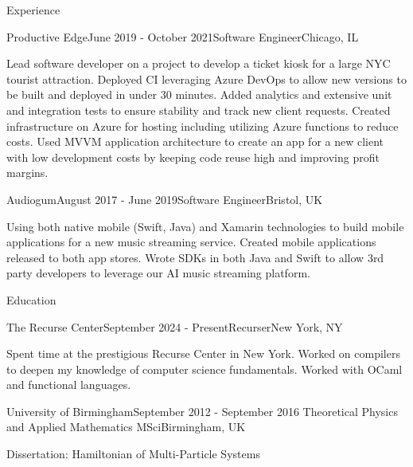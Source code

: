 \documentclass[
	11pt, %
]{resume} %
\begin{document}
\begin{rSection}{Experience}
	\begin{rSubsection}{Productive Edge}{June 2019 - October 2021}{Software Engineer}{Chicago, IL}
		\item Lead software developer on a project to develop a ticket kiosk for a large NYC tourist attraction. Deployed CI leveraging Azure DevOps to allow new versions to be built and deployed in under 30 minutes. Added analytics and extensive unit and integration tests to ensure stability and track new client requests. Created infrastructure on Azure for hosting including utilizing Azure functions to reduce costs. Used MVVM application architecture to create an app for a new client with low development costs by keeping code reuse high and improving profit margins. 
	\end{rSubsection}


	\begin{rSubsection}{Audiogum}{August 2017 - June 2019}{Software Engineer}{Bristol, UK}	
	\item	Using both native mobile (Swift, Java) and Xamarin technologies to build mobile applications for a new music streaming service. Created mobile applications released to both app stores. Wrote SDKs in both Java and Swift to allow 3rd party developers to leverage our AI music streaming platform.
	\end{rSubsection}

\end{rSection}


\begin{rSection}{Education}
	
	\begin{rSubsection}{The Recurse Center}{September 2024 - Present}{Recurser}{New York, NY}
		\item Spent time at the prestigious Recurse Center in New York. Worked on compilers to deepen my knowledge of computer science fundamentals. Worked with OCaml and functional languages.
	\end{rSubsection}

	\begin{rSubsection}{University of Birmingham}{September 2012 - September 2016}{ Theoretical Physics and Applied Mathematics MSci}{Birmingham, UK}
		\item Dissertation: Hamiltonian of Multi-Particle Systems
	\end{rSubsection}

\end{rSection}
\end{document}
